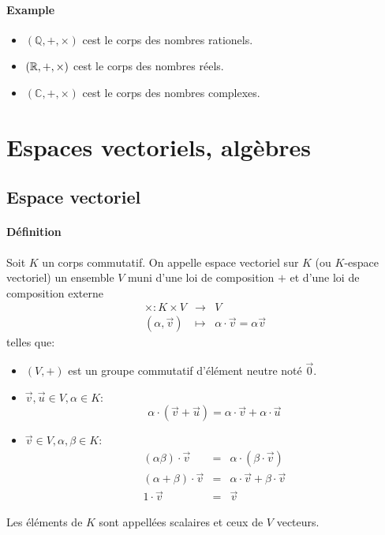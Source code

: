 \paragraph{Example}
\begin{itemize}
  \item $(\mathbb{Q}, +, \times)$ cest le corps des nombres rationels.
  \item $(\mathbb{R}, +, \times)$ cest le corps des nombres réels.
  \item $(\mathbb{C}, +, \times)$ cest le corps des nombres complexes.
\end{itemize}

%
%
\section{Espaces vectoriels, algèbres}
%
%

%
\subsection{Espace vectoriel}
%
\paragraph{Définition} Soit $K$ un corps commutatif. On appelle espace vectoriel sur $K$ (ou $K$-espace vectoriel) un ensemble $V$ muni d'une loi de composition $+$ et d'une loi de composition externe
\begin{eqnarray*}
  \times: K \times V &\rightarrow& V \\
  (\alpha, \vec{v}) &\mapsto& \alpha\cdot\vec{v} = \alpha\vec{v}
\end{eqnarray*}
telles que:
\begin{itemize}
  \item $(V, +)$ est un groupe commutatif d'élément neutre noté $\vec{0}$.
  \item \forall $\vec{v}, \vec{u} \in V, \alpha \in K$: $$\alpha \cdot (\vec{v}+\vec{u}) = \alpha \cdot \vec{v} + \alpha \cdot \vec{u}$$
  \item \forall $\vec{v} \in V, \alpha, \beta \in K$:
    \begin{eqnarray*}
      (\alpha \beta) \cdot \vec{v} &=& \alpha \cdot (\beta \cdot \vec{v}) \\
      (\alpha + \beta) \cdot \vec{v} &=& \alpha \cdot \vec{v} + \beta \cdot \vec{v} \\
      1 \cdot \vec{v} &=& \vec{v}
    \end{eqnarray*}
\end{itemize}
Les éléments de $K$ sont appellées scalaires et ceux de $V$ vecteurs.

